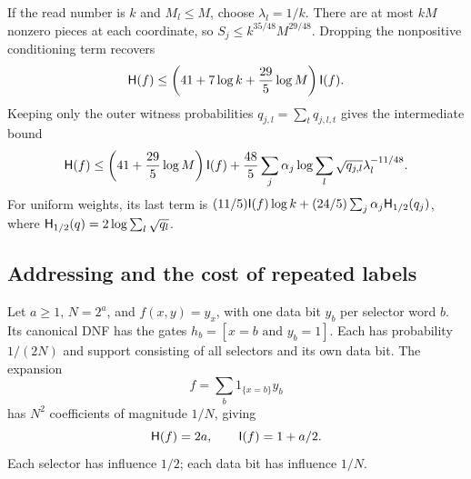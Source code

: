 If the read number is $k$ and $M_l\le M$, choose $\lambda_l=1/k$. There are at most $kM$ nonzero pieces at each coordinate, so $S_j\le k^{35/48}M^{29/48}$. Dropping the nonpositive conditioning term recovers
\[
 \mathsf H(f)\le\left(41+7\log k+\frac{29}{5}\log M\right)\mathsf I(f).
\]
Keeping only the outer witness probabilities $q_{j,l}=\sum_tq_{j,l,t}$ gives the intermediate bound
\begin{equation}\label{eq:outerfractional}
 \mathsf H(f)\le\left(41+\frac{29}{5}\log M\right)\mathsf I(f)
 +\frac{48}{5}\sum_j\alpha_j
       \log\sum_l\sqrt{q_{j,l}}\lambda_l^{-11/48}.
\end{equation}
For uniform weights, its last term is $(11/5)\mathsf I(f)\log k+(24/5)\sum_j\alpha_j\mathsf H_{1/2}(q_j)$, where $\mathsf H_{1/2}(q)=2\log\sum_l\sqrt{q_l}$.

\subsection{Addressing and the cost of repeated labels}

Let $a\ge1$, $N=2^a$, and $f(x,y)=y_x$, with one data bit $y_b$ per selector word $b$. Its canonical DNF has the gates $h_b=[x=b\text{ and }y_b=1]$. Each has probability $1/(2N)$ and support consisting of all selectors and its own data bit. The expansion
\[
 f=\sum_b1_{\{x=b\}}y_b
\]
has $N^2$ coefficients of magnitude $1/N$, giving
\begin{equation}\label{eq:addressingHI}
 \mathsf H(f)=2a,\qquad\mathsf I(f)=1+a/2.
\end{equation}
Each selector has influence $1/2$; each data bit has influence $1/N$.


